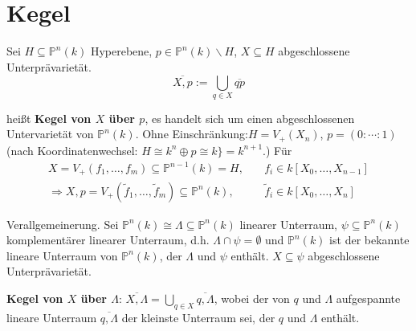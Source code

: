 \section{Kegel}
\label{sec:Kegel}

Sei $H\subseteq\mathbb{P}^{n}(k)$ Hyperebene, $p\in\mathbb{P}^{n}(k)\backslash H$,
$X\subseteq H$ abgeschlossene Unterprävarietät.
\[
  \overline{X,p}:=\bigcup_{q\in X}\overline{qp}
\]

heißt \textbf{Kegel von $X$ über $p$}, es handelt sich um einen
abgeschlossenen Untervarietät von $\mathbb{P}^{n}(k)$. Ohne Einschränkung:$H=V_{+}(X_{n})$,
$p=(0:\cdots:1)$ (nach Koordinatenwechsel: $H\cong k^{n}\oplus p\cong k\}=k^{n+1}$.)
Für  
\begin{align*}
  X=V_{+}(f_{1},\ldots,f_{m})\subseteq\mathbb{P}^{n-1}(k)=H, & \quad f_{i}\in k[X_{0},\ldots,X_{n-1}]\\
  \Rightarrow X,p=V_{+}(\tilde{f}_{1},\ldots,\tilde{f}_{m})\subseteq\mathbb{P}^{n}(k), & \quad\tilde{f}_{i}\in k[X_{0},\ldots,X_{n}]
\end{align*}

Verallgemeinerung. Sei $\mathbb{P}^{n}(k)\cong\Lambda\subseteq\mathbb{P}^{n}(k)$
linearer Unterraum, $\psi\subseteq\mathbb{P}^{n}(k)$ komplementärer
linearer Unterraum, d.h. $\Lambda\cap\psi=\emptyset$ und $\mathbb{P}^{n}(k)$
ist der bekannte lineare Unterraum von $\mathbb{P}^{n}(k)$, der $\Lambda$
und $\psi$ enthält. $X\subseteq\psi$ abgeschlossene Unterprävarietät.

\textbf{Kegel von $X$ über $\Lambda$}: $\overline{X,\Lambda}=\bigcup_{q\in X}\overline{q,\Lambda}$,
wobei der von $q$ und $\Lambda$ aufgespannte lineare Unterraum $\overline{q,\Lambda}$
der kleinste Unterraum sei, der $q$ und $\Lambda$ enthält.
